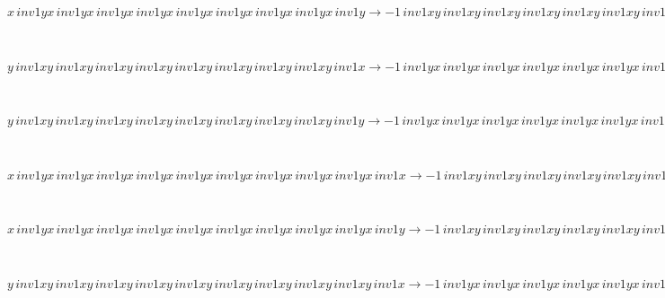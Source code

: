 \documentclass[rep10,leqno]{report}
\begin{document}
\begin{minipage}{6in}
$
x\,
 inv1yx\,
 inv1yx\,
 inv1yx\,
 inv1yx\,
 inv1yx\,
 inv1yx\,
 inv1yx\,
 inv1yx\,
 inv1y\rightarrow -1\,
 inv1xy\,
 inv1xy\,
 inv1xy\,
 inv1xy\,
 inv1xy\,
 inv1xy\,
 inv1xy\,
 inv1y + inv1xy\,
 inv1xy\,
 inv1xy\,
 inv1xy\,
 inv1xy\,
 inv1xy\,
 inv1xy\,
 inv1xy\,
 inv1y + x\,
 inv1yx\,
 inv1yx\,
 inv1yx\,
 inv1yx\,
 inv1yx\,
 inv1yx\,
 inv1yx\,
 inv1yx
$
\end{minipage}\medskip \\
\begin{minipage}{6in}
$
y\,
 inv1xy\,
 inv1xy\,
 inv1xy\,
 inv1xy\,
 inv1xy\,
 inv1xy\,
 inv1xy\,
 inv1xy\,
 inv1x\rightarrow -1\,
 inv1yx\,
 inv1yx\,
 inv1yx\,
 inv1yx\,
 inv1yx\,
 inv1yx\,
 inv1yx\,
 inv1x + inv1yx\,
 inv1yx\,
 inv1yx\,
 inv1yx\,
 inv1yx\,
 inv1yx\,
 inv1yx\,
 inv1yx\,
 inv1x + y\,
 inv1xy\,
 inv1xy\,
 inv1xy\,
 inv1xy\,
 inv1xy\,
 inv1xy\,
 inv1xy\,
 inv1xy
$
\end{minipage}\medskip \\
\begin{minipage}{6in}
$
y\,
 inv1xy\,
 inv1xy\,
 inv1xy\,
 inv1xy\,
 inv1xy\,
 inv1xy\,
 inv1xy\,
 inv1xy\,
 inv1y\rightarrow -1\,
 inv1yx\,
 inv1yx\,
 inv1yx\,
 inv1yx\,
 inv1yx\,
 inv1yx\,
 inv1yx\,
 inv1yx + inv1yx\,
 inv1yx\,
 inv1yx\,
 inv1yx\,
 inv1yx\,
 inv1yx\,
 inv1yx\,
 inv1yx\,
 inv1y
$
\end{minipage}\medskip \\
\begin{minipage}{6in}
$
x\,
 inv1yx\,
 inv1yx\,
 inv1yx\,
 inv1yx\,
 inv1yx\,
 inv1yx\,
 inv1yx\,
 inv1yx\,
 inv1yx\,
 inv1x\rightarrow -1\,
 inv1xy\,
 inv1xy\,
 inv1xy\,
 inv1xy\,
 inv1xy\,
 inv1xy\,
 inv1xy\,
 inv1xy\,
 inv1xy + inv1xy\,
 inv1xy\,
 inv1xy\,
 inv1xy\,
 inv1xy\,
 inv1xy\,
 inv1xy\,
 inv1xy\,
 inv1xy\,
 inv1x
$
\end{minipage}\medskip \\
\begin{minipage}{6in}
$
x\,
 inv1yx\,
 inv1yx\,
 inv1yx\,
 inv1yx\,
 inv1yx\,
 inv1yx\,
 inv1yx\,
 inv1yx\,
 inv1yx\,
 inv1y\rightarrow -1\,
 inv1xy\,
 inv1xy\,
 inv1xy\,
 inv1xy\,
 inv1xy\,
 inv1xy\,
 inv1xy\,
 inv1xy\,
 inv1y + inv1xy\,
 inv1xy\,
 inv1xy\,
 inv1xy\,
 inv1xy\,
 inv1xy\,
 inv1xy\,
 inv1xy\,
 inv1xy\,
 inv1y + x\,
 inv1yx\,
 inv1yx\,
 inv1yx\,
 inv1yx\,
 inv1yx\,
 inv1yx\,
 inv1yx\,
 inv1yx\,
 inv1yx
$
\end{minipage}\medskip \\
\begin{minipage}{6in}
$
y\,
 inv1xy\,
 inv1xy\,
 inv1xy\,
 inv1xy\,
 inv1xy\,
 inv1xy\,
 inv1xy\,
 inv1xy\,
 inv1xy\,
 inv1x\rightarrow -1\,
 inv1yx\,
 inv1yx\,
 inv1yx\,
 inv1yx\,
 inv1yx\,
 inv1yx\,
 inv1yx\,
 inv1yx\,
 inv1x + inv1yx\,
 inv1yx\,
 inv1yx\,
 inv1yx\,
 inv1yx\,
 inv1yx\,
 inv1yx\,
 inv1yx\,
 inv1yx\,
 inv1x + y\,
 inv1xy\,
 inv1xy\,
 inv1xy\,
 inv1xy\,
 inv1xy\,
 inv1xy\,
 inv1xy\,
 inv1xy\,
 inv1xy
$
\end{minipage}\medskip \\
\end{document}
